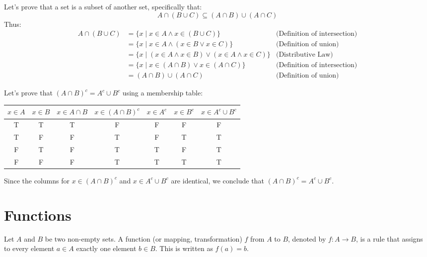 \begin{eg}
    Let's prove that a set is a subset of another set, specifically that:
    \[ A \cap (B \cup C) \subseteq (A \cap B) \cup (A \cap C) \]
    Thus:
    \begin{align*}
        A \cap (B \cup C) &= \{x \mid x \in A \land x \in (B \cup C)\} &\text{(Definition of intersection)}\\
        &= \{x \mid x \in A \land (x \in B \lor x \in C)\} &\text{(Definition of union)}\\
        &= \{x \mid (x \in A \land x \in B) \lor (x \in A \land x \in C)\} &\text{(Distributive Law)}\\
        &= \{x \mid x \in (A \cap B) \lor x \in (A \cap C)\} &\text{(Definition of intersection)}\\
        &= (A \cap B) \cup (A \cap C) &\text{(Definition of union)}
    \end{align*}
\end{eg}

\begin{eg}
    Let's prove that $(A \cap B)^c = A^c \cup B^c$ using a membership table:
    \begin{center}
        \begin{tabular}{c|c|c|c|c|c|c}
            $x \in A$ & $x \in B$ & $x \in A \cap B$ & $x \in (A \cap B)^c$ & $x \in A^c$ & $x \in B^c$ & $x \in A^c \cup B^c$\\
            \hline
            T & T & T & F & F & F & F\\
            T & F & F & T & F & T & T\\
            F & T & F & T & T & F & T\\
            F & F & F & T & T & T & T\\
        \end{tabular}
    \end{center}
    Since the columns for $x \in (A \cap B)^c$ and $x \in A^c \cup B^c$ are identical, we conclude that $(A \cap B)^c = A^c \cup B^c$.
\end{eg}

\section{Functions}
\begin{definition}[Function]
    Let $A$ and $B$ be two non-empty sets. A function (or mapping, transformation) $f$ from $A$ to $B$, denoted by $f: A \to B$, is a rule that assigns to every element $a \in A$ exactly one element $b \in B$. This is written as $f(a) = b$.
\end{definition}

